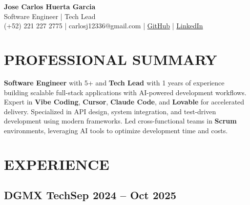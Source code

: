 \documentclass[a4paper,10pt]{article}
\newcommand{\kw}[1]{\textbf{\textcolor{keyword}{#1}}}
\begin{document}
\begin{center}
{\bfseries\LARGE Jose Carlos Huerta Garcia} \\
Software Engineer | Tech Lead \\
(+52) 221 227 2775 | carlosj12336@gmail.com | \href{https://github.com/jcarloshg}{GitHub} | \href{https://www.linkedin.com/in/jose-carlos-huerta-garcia-773952212}{LinkedIn}
\end{center}

\section*{PROFESSIONAL SUMMARY}
\kw{Software Engineer} with 5+ and \kw{Tech Lead } with 1 years of experience building scalable full-stack applications with AI-powered development workflows. Expert in \kw{Vibe Coding}, \kw{Cursor}, \kw{Claude Code}, and \kw{Lovable} for accelerated delivery. Specialized in API design, system integration, and test-driven development using modern frameworks. Led cross-functional teams in \kw{Scrum} environments, leveraging AI tools to optimize development time and costs.

\section*{EXPERIENCE}

\subsection*{\small DGMX Tech\hfill\textbf{Sep 2024 -- Oct 2025}}
\end{document}
